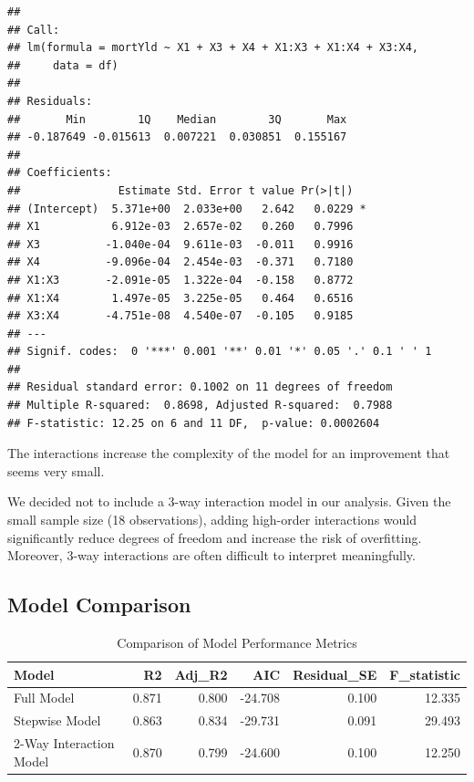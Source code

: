 \documentclass[
  11pt,
]{article}
\begin{document}
\begin{verbatim}
## 
## Call:
## lm(formula = mortYld ~ X1 + X3 + X4 + X1:X3 + X1:X4 + X3:X4, 
##     data = df)
## 
## Residuals:
##       Min        1Q    Median        3Q       Max 
## -0.187649 -0.015613  0.007221  0.030851  0.155167 
## 
## Coefficients:
##               Estimate Std. Error t value Pr(>|t|)  
## (Intercept)  5.371e+00  2.033e+00   2.642   0.0229 *
## X1           6.912e-03  2.657e-02   0.260   0.7996  
## X3          -1.040e-04  9.611e-03  -0.011   0.9916  
## X4          -9.096e-04  2.454e-03  -0.371   0.7180  
## X1:X3       -2.091e-05  1.322e-04  -0.158   0.8772  
## X1:X4        1.497e-05  3.225e-05   0.464   0.6516  
## X3:X4       -4.751e-08  4.540e-07  -0.105   0.9185  
## ---
## Signif. codes:  0 '***' 0.001 '**' 0.01 '*' 0.05 '.' 0.1 ' ' 1
## 
## Residual standard error: 0.1002 on 11 degrees of freedom
## Multiple R-squared:  0.8698, Adjusted R-squared:  0.7988 
## F-statistic: 12.25 on 6 and 11 DF,  p-value: 0.0002604
\end{verbatim}

The interactions increase the complexity of the model for an improvement
that seems very small.

We decided not to include a 3-way interaction model in our analysis.
Given the small sample size (18 observations), adding high-order
interactions would significantly reduce degrees of freedom and increase
the risk of overfitting. Moreover, 3-way interactions are often
difficult to interpret meaningfully.

\subsection{Model Comparison}\label{model-comparison}

\begingroup\fontsize{8}{10}\selectfont

\begin{longtable}[t]{lrrrrr}
\caption{\label{tab:unnamed-chunk-13}Comparison of Model Performance Metrics}\\
\toprule
Model & R2 & Adj\_R2 & AIC & Residual\_SE & F\_statistic\\
\midrule
Full Model & 0.871 & 0.800 & -24.708 & 0.100 & 12.335\\
Stepwise Model & 0.863 & 0.834 & -29.731 & 0.091 & 29.493\\
2-Way Interaction Model & 0.870 & 0.799 & -24.600 & 0.100 & 12.250\\
\bottomrule
\end{longtable}
\endgroup{}
\end{document}
